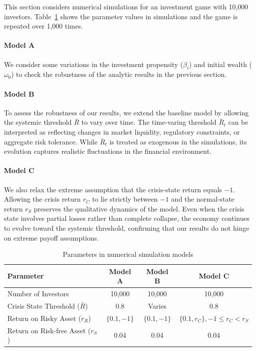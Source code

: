 \documentclass[11pt,a4paper]{article}
\begin{document}
This section considers numerical simulations for an investment game with 10,000 investors.  Table~\ref{tb:parameters} shows the parameter values in simulations and the game is repeated over 1,000 times. \\


\paragraph{Model A} We consider some variations in the investment propensity ($\beta_i$) and initial wealth ($\omega_{0}$) to check the robustness of the analytic results in the previous section. 

\paragraph{Model B} To assess the robustness of our results, we extend the baseline model by allowing the systemic threshold $\bar R$ to vary over time. The time-varing threshold $\bar R_t$ can be interpreted as reflecting changes in market liquidity, regulatory constraints, or aggregate risk tolerance. While $\bar R_t$ is treated as exogenous in the simulations, its evolution captures realistic fluctuations in the financial environment.

\paragraph{Model C} We also relax the extreme assumption that the crisis-state return equals $-1$. Allowing the crisis return $r_C$ to lie strictly between $-1$ and the normal-state return $r_S$ preserves the qualitative dynamics of the model. Even when the crisis state involves partial losses rather than complete collapse, the economy continues to evolve toward the systemic threshold, confirming that our results do not hinge on extreme payoff assumptions.


\begin{table}[h!]
	\centering 	\caption{Parameters in numerical simulation models}
	\begin{tabular}{l|ccc} \toprule 
		Parameter & \hfil Model A & Model B & Model C  \\
		\midrule
		Number of Investors & \hfil 10,000 & 10,000 & 10,000\\
		Crisis State Threshold ($\bar{R}$) & \hfil 0.8 & Varies & 0.8\\
		Return on Risky Asset ($r_{R}$) & \hfil $\{0.1, -1\}$ & $\{0.1, -1\}$ & $\{0.1, r_C\}, -1 \le r_C < r_S$ \\
		Return on Risk-free Asset ($r_{S}$) & \hfil 0.04 & 0.04 & 0.04\\         \bottomrule
	\end{tabular}
       \label{tb:parameters}
\end{table}
\end{document}
